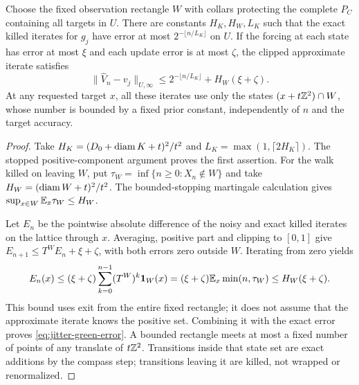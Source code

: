 \begin{lemma}
\label{lem:aperture-green}
Choose the fixed observation rectangle $W$ with collars protecting the
complete $P_C$ containing all targets in $U$. There are constants
$H_K,H_W,L_K$ such that the exact killed iterates for $g_j$ have error
at most $2^{-\lfloor n/L_K\rfloor}$ on $U$. If the forcing at each
state has error at most $\xi$ and each update error is at most $\zeta$,
the clipped approximate iterate satisfies
\begin{equation}\label{eq:jitter-green-error}
 \|\widehat V_n-v_j\|_{U,\infty}
       \le2^{-\lfloor n/L_K\rfloor}+H_W(\xi+\zeta).
\end{equation}
At any requested target $x$, all these iterates use only the states
$(x+t\mathbb Z^2)\cap W$, whose number is bounded by a fixed prior constant,
independently of $n$ and the target accuracy.
\end{lemma}
\begin{proof}
Take $H_K=(D_0+\operatorname{diam} K+t)^2/t^2$ and
$L_K=\max(1,\lceil2H_K\rceil)$. The stopped positive-component
argument proves the first assertion. For the walk killed on leaving
$W$, put $\tau_W=\inf\{n\ge0:X_n\notin W\}$ and take
$H_W=(\operatorname{diam} W+t)^2/t^2$. The bounded-stopping martingale calculation
gives $\sup_{x\in W}\mathbb E_x\tau_W\le H_W$.

Let $E_n$ be the pointwise absolute difference of the noisy and exact
killed iterates on the lattice through $x$. Averaging, positive part
and clipping to $[0,1]$ give
$E_{n+1}\le T^WE_n+\xi+\zeta$, with both errors zero outside $W$.
Iterating from zero yields
\[
 E_n(x)\le(\xi+\zeta)
       \sum_{k=0}^{n-1}(T^W)^k\mathbf 1_W(x)
   =(\xi+\zeta)\mathbb E_x\min(n,\tau_W)\le H_W(\xi+\zeta).
\]
This bound uses exit from the entire fixed rectangle; it does not assume
that the approximate iterate knows the positive set. Combining it with
the exact error proves \eqref{eq:jitter-green-error}. A bounded rectangle
meets at most a fixed number of points of any translate of $t\mathbb Z^2$.
Transitions inside that state set are exact additions by the compass
step; transitions leaving it are killed, not wrapped or renormalized.
\end{proof}

